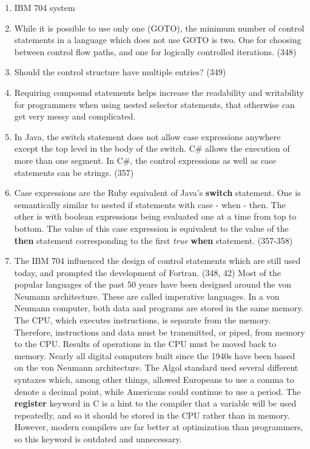 \begin{answer}
\begin{enumerate}
\item IBM 704 system
\item While it is possible to use only one (GOTO), the minimum number of control statements in a language which does not use GOTO is two. One for choosing between control flow paths, and one for logically controlled iterations. (348)
\item Should the control structure have multiple entries? (349)
\item Requiring compound statements helps increase the readability and writability for programmers when using nested selector statements, that otherwise can get very messy and complicated.
\item In Java, the switch statement does not allow case expressions anywhere except the top level in the body of the switch.  C\#  allows the execution of more than one segment. In C\#, the control expressions as well as case statements can be strings. (357)
\item Case expressions are the Ruby equivalent of Java's \textbf{switch} statement. One is semantically similar to nested if statements with case - when - then. The other is with boolean expressions being evaluated one at a time from top to bottom. The value of this case expression is equivalent to the value of the \textbf{then} statement corresponding to the first \textit{true} \textbf{when} statement. (357-358)
\item The IBM 704 influenced the design of control statements which are still used today, and prompted the development of Fortran. (348, 42)
    Most of the popular languages of the past 50 years have been designed around the von Neumann architecture. These are called imperative languages. In a von Neumann computer, both data and programs are stored in the same memory. The CPU, which executes instructions, is separate from the memory. Therefore, instructions and data must be transmitted, or piped, from memory to the CPU. Results of operations in the CPU must be moved back to memory. Nearly all digital computers built since the 1940s have been based on the von Neumann architecture.
The Algol standard used several different syntaxes which, among other things, allowed Europeans to use a comma to denote a decimal point, while Americans could continue to use a period.
The \textbf{register} keyword in C is a hint to the compiler that a variable will be used repeatedly, and so it should be stored in the CPU rather than in memory. However, modern compilers are far better at optimization than programmers, so this keyword is outdated and unnecessary.

\end{enumerate}
\end{answer}
